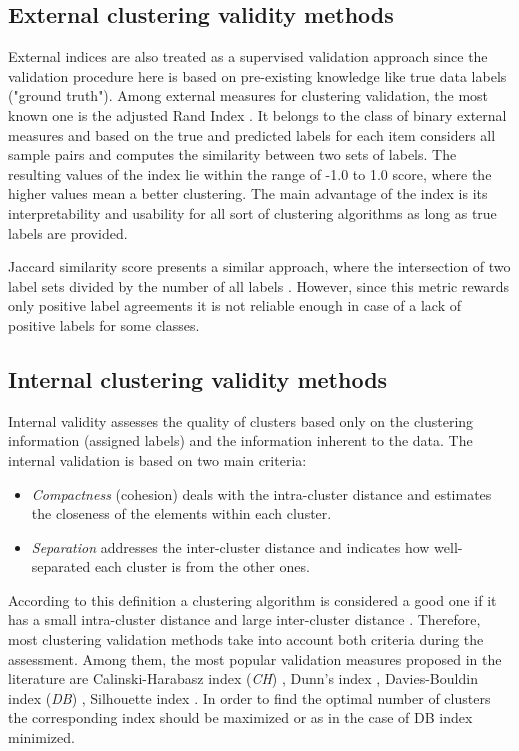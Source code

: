 \documentclass[fontsize=12pt,a4paper,twoside,openany]{scrbook}
\begin{document}
\subsection{External clustering validity methods}
External indices are also treated as a supervised validation approach \parencite{Palacio19} since the validation procedure here is based on pre-existing knowledge like true data labels ("ground truth"). 
Among external measures for clustering validation, the most known one is the adjusted Rand Index \parencite{Hubert85}. It belongs to the class of binary external measures \parencite{Handl05} and based on the true and predicted labels for each item considers all sample pairs and computes the similarity between two sets of labels. The resulting values of the index lie within the range of -1.0 to 1.0 score, where the higher values mean a better clustering. The main advantage of the index is its interpretability and usability for all sort of clustering algorithms as long as true labels are provided. 

Jaccard similarity score presents a similar approach, where the intersection of two label sets divided by the number of all labels \parencite{Arnaboldi15}. However, since this metric rewards only positive label agreements \parencite{Handl05} it is not reliable enough in case of a lack of positive labels for some classes.

\subsection{Internal clustering validity methods}
Internal validity assesses the quality of clusters based only on the clustering information (assigned labels) and the information inherent to the data. The internal validation is based on two main criteria:
\begin{itemize}
  \item \emph{Compactness} (cohesion) deals with the intra-cluster distance and estimates the closeness of the elements within each cluster.
  \item \emph{Separation} addresses the inter-cluster distance and indicates how well-separated each cluster is from the other ones.
\end{itemize}
According to this definition a clustering algorithm is considered a good one if it has a small intra-cluster distance and large inter-cluster distance \parencite{Kim05}. Therefore, most clustering validation methods take into account both criteria during the assessment. Among them, the most popular validation measures proposed in the literature are Calinski-Harabasz index (\emph{CH}) \parencite{Calinski74}, Dunn's index \parencite{Dunn74}, Davies-Bouldin index (\emph{DB}) \parencite{DaviesB79}, Silhouette index \parencite{Rousseeuw87}. In order to find the optimal number of clusters the corresponding index should be maximized or as in the case of DB index minimized.
\end{document}
